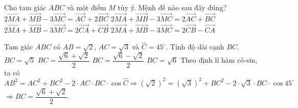\begin{ex}%
Cho tam giác $ABC$ và một điểm $M$ tùy ý. Mệnh đề nào sau đây đúng?
\choice
{$2\overrightarrow{MA}+\overrightarrow{MB}-3\overrightarrow{MC}=\overrightarrow{AC}+2\overrightarrow{BC}$}
{$2\overrightarrow{MA}+\overrightarrow{MB}-3\overrightarrow{MC}=2\overrightarrow{AC}+\overrightarrow{BC}$}
{\True $2\overrightarrow{MA}+\overrightarrow{MB}-3\overrightarrow{MC}=2\overrightarrow{CA}+\overrightarrow{CB}$}
{$2\overrightarrow{MA}+\overrightarrow{MB}-3\overrightarrow{MC}=2\overrightarrow{CB}-\overrightarrow{CA}$}
\end{ex}

\begin{ex}%
Tam giác $ ABC$ có $ AB=\sqrt{2}$, $AC=\sqrt{3}$ và $ \widehat{C}=45^\circ $. Tính độ dài cạnh $ BC$.
\choice
{$ BC=\sqrt{5}$}
{\True $ BC=\dfrac{\sqrt{6}+\sqrt{2}}{2}$}
{$ BC=\dfrac{\sqrt{6}-\sqrt{2}}{2}$}
{$ BC=\sqrt{6}$}
\loigiai
{Theo định lí hàm cô-sin, ta có\\
$ AB^2=AC^2+BC^2-2\cdot AC\cdot BC\cdot \cos \widehat{C}\Rightarrow {(\sqrt{2} )}^2={(\sqrt{3} )}^2+BC^2-2\cdot \sqrt{3}\cdot BC\cdot \cos 45^\circ $ \\
$ \Rightarrow BC=\dfrac{\sqrt{6}+\sqrt{2}}{2}$.}
\end{ex}

